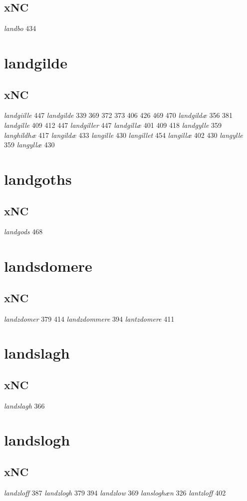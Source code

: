 \documentclass[a4paper,twocolumn]{article}
\begin{document}
\subsection{xNC}
\label{sec:org5591d1b}
\emph{landbo} 434 
\section{landgilde}
\label{sec:org312f0fe}
\subsection{xNC}
\label{sec:orgad41285}
\emph{landgiille} 447 \emph{landgilde} 339 369 372 373 406 426 469 470 \emph{landgildæ} 356 381 \emph{landgille} 409 412 447 \emph{landgiller} 447 \emph{landgillæ} 401 409 418 \emph{landgylle} 359 \emph{langhildhæ} 417 \emph{langildæ} 433 \emph{langille} 430 \emph{langillet} 454 \emph{langillæ} 402 430 \emph{langylle} 359 \emph{langyllæ} 430 
\section{landgoths}
\label{sec:orgfd720e4}
\subsection{xNC}
\label{sec:org0021efb}
\emph{landgods} 468 
\section{landsdomere}
\label{sec:orgca24ea5}
\subsection{xNC}
\label{sec:org00fac0c}
\emph{landzdomer} 379 414 \emph{landzdommere} 394 \emph{lantzdomere} 411 
\section{landslagh}
\label{sec:org20752ab}
\subsection{xNC}
\label{sec:org0d3d8cc}
\emph{landslagh} 366 
\section{landslogh}
\label{sec:orgb2dd913}
\subsection{xNC}
\label{sec:org6de8062}
\emph{landzloff} 387 \emph{landzlogh} 379 394 \emph{landzlow} 369 \emph{lansloghæn} 326 \emph{lantzloff} 402 
\end{document}
